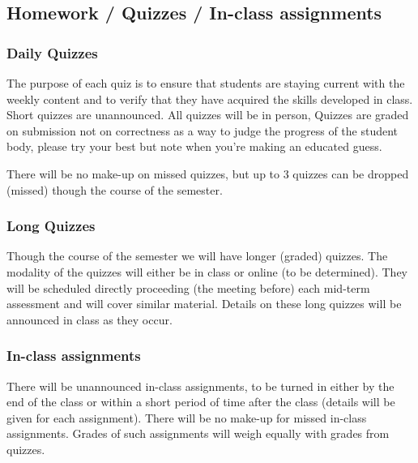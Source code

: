 \documentclass[12pt]{scrartcl}
\begin{document}
\subsection{Homework / Quizzes / In-class assignments}

\subsubsection{Daily Quizzes}
The purpose of each quiz is to ensure that students are staying current with the weekly content and to verify that they have acquired the skills developed in class. 
Short quizzes are unannounced. 
All quizzes will be in person, 
Quizzes are graded on submission not on correctness as a way to judge the progress of the student body, please try your best but note when you're making an educated guess. 

There will be no make-up on missed quizzes, but up to 3 quizzes can be dropped (missed) though the course of the semester.
 
 \subsubsection{Long Quizzes}
 Though the course of the semester we will have longer (graded) quizzes. 
 The modality of the quizzes will either be in class or online (to be determined). 
 They will be scheduled directly proceeding (the meeting before) each mid-term assessment and will cover similar material. 
 Details on these long quizzes will be announced in class as they occur. 
 
\subsubsection{In-class assignments}
There will be unannounced in-class assignments, to be turned in either by the end of the class or within a short period of time after the class (details will be given for each assignment). 
There will be no make-up for missed in-class assignments. 
Grades of such assignments will weigh equally with grades from quizzes. 
\end{document}
